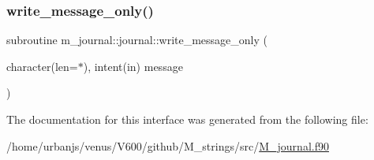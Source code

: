 \mbox{\label{interfacem__journal_1_1journal_a1cb40f602a1e1c546bce71652a779d31}} 
\subsubsection{\texorpdfstring{write\+\_\+message\+\_\+only()}{write\_message\_only()}}
{\footnotesize\ttfamily subroutine m\+\_\+journal\+::journal\+::write\+\_\+message\+\_\+only (\begin{DoxyParamCaption}\item[{character(len=$\ast$), intent(in)}]{message }\end{DoxyParamCaption})\hspace{0.3cm}{\ttfamily [private]}}



The documentation for this interface was generated from the following file\+:\begin{DoxyCompactItemize}
\item 
/home/urbanjs/venus/\+V600/github/\+M\+\_\+strings/src/\mbox{\hyperlink{M__journal_8f90}{M\+\_\+journal.\+f90}}\end{DoxyCompactItemize}
